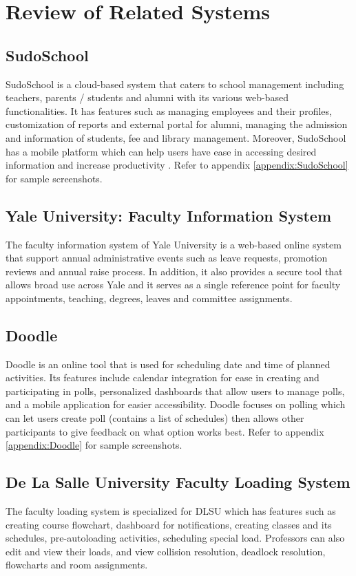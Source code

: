 \section{Review of Related Systems}

\subsection{SudoSchool}
SudoSchool is a cloud-based system that caters to school management including teachers, parents / students and alumni with its various web-based functionalities. It has features such as managing employees and their profiles, customization of reports and external portal for alumni, managing the admission and information of students, fee and library management. Moreover, SudoSchool has a mobile platform which can help users have ease in accessing desired information and increase productivity \cite{ref:SudoSchool}. Refer to appendix \ref{appendix:SudoSchool} for sample screenshots.

\subsection{Yale University: Faculty Information System}
The faculty information system of Yale University is a web-based online system that support annual administrative events such as leave requests, promotion reviews and annual raise process. In addition, it also provides a secure tool that allows broad use across Yale and it serves as a single reference point for faculty appointments, teaching, degrees, leaves and committee assignments. 

\subsection{Doodle}
Doodle is an online tool that is used for scheduling date and time of planned activities. Its features include calendar integration for ease in creating and participating in polls, personalized dashboards that allow users to manage polls, and a mobile application for easier accessibility. Doodle focuses on polling which can let users create poll (contains a list of schedules) then allows other participants to give feedback on what option works best. Refer to appendix \ref{appendix:Doodle} for sample screenshots.

\subsection{De La Salle University Faculty Loading System}
The faculty loading system is specialized for DLSU which has features such as creating course flowchart, dashboard for notifications, creating classes and its schedules, pre-autoloading activities, scheduling special load. Professors can also edit and view their loads, and view collision resolution, deadlock resolution, flowcharts and room assignments. 

